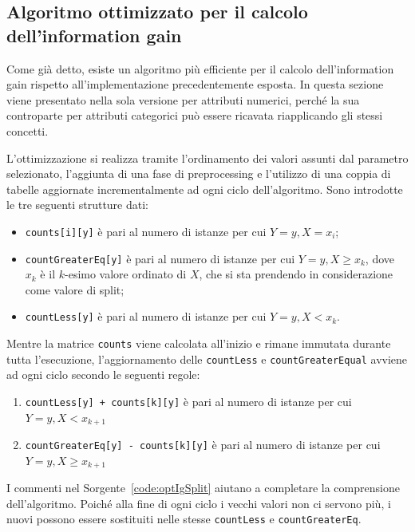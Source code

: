 \documentclass[a4paper,11pt,twoside,openright,fleqn]{book}
\renewcommand{\lstlistingname}{Sorgente}
\newcommand{\code}[1]{\texttt{#1}}
\begin{document}
\subsection{Algoritmo ottimizzato per il calcolo dell'information gain}

Come già detto, esiste un algoritmo più efficiente per il calcolo dell'information gain rispetto all'implementazione precedentemente esposta. In questa sezione viene presentato nella sola versione per attributi numerici, perché la sua controparte per attributi categorici può essere ricavata riapplicando gli stessi concetti.

L'ottimizzazione si realizza tramite l'ordinamento dei valori assunti dal parametro selezionato, l'aggiunta di una fase di preprocessing e l'utilizzo di una coppia di tabelle aggiornate incrementalmente ad ogni ciclo dell'algoritmo. Sono introdotte le tre seguenti strutture dati:

\begin{itemize}
\item \code{counts[i][y]} è pari al numero di istanze per cui $Y = y, X = x_i$;
\item \code{countGreaterEq[y]} è pari al numero di istanze per cui $Y = y, X \geq x_k$, dove $x_k$ è il $k$-esimo valore ordinato di $X$, che si sta prendendo in considerazione come valore di split;
\item \code{countLess[y]} è pari al numero di istanze per cui $Y = y, X < x_k$.
\end{itemize}

Mentre la matrice \code{counts} viene calcolata all'inizio e rimane immutata durante tutta l'esecuzione, l'aggiornamento delle \code{countLess} e \code{countGreaterEqual} avviene ad ogni ciclo secondo le seguenti regole:
\begin{enumerate}
\item \code{countLess[y] + counts[k][y]} è pari al numero di istanze per cui $Y = y, X < x_{k+1}$
\item \code{countGreaterEq[y] - counts[k][y]} è pari al numero di istanze per cui $Y = y, X \geq x_{k+1}$
\end{enumerate}
I commenti nel \lstlistingname\ \ref{code:optIgSplit} aiutano a completare la comprensione dell'algoritmo. Poiché alla fine di ogni ciclo i vecchi valori non ci servono più, i nuovi possono essere sostituiti nelle stesse \code{countLess} e \code{countGreaterEq}.
\end{document}
